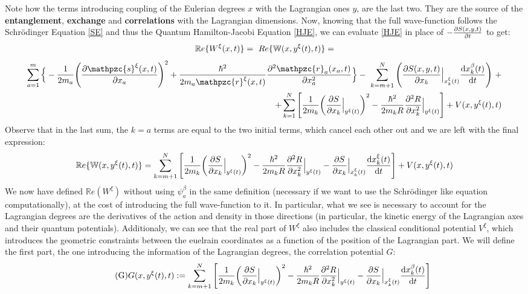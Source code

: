 \documentclass[11pt, a4paper]{article} %
\newcommand{\R}{\mathbb{R}} %
\newcommand{\z}{\mathpzc{s}}
\newcommand{\p}{\mathpzc{r}}
\newcommand{\W}{\mathbb{W}}
\begin{document}
Note how the terms introducing coupling of the Eulerian degrees $x$ with the Lagrangian ones $y$, are the last two. They are the source of the {\bf entanglement}, {\bf exchange} and {\bf correlations} with the Lagrangian dimensions. Now, knowing that the full wave-function follows the Schrödinger Equation \eqref{SE} and thus the Quantum Hamilton-Jacobi Equation \eqref{HJE}, we can evaluate \eqref{HJE} in place of $-\pdv{S(x,y,t)}{t}$ to get:\vspace{-0.2cm}
$$
\R e\{W^\xi(x,t)\}=\ Re\{\W(x, y^\xi(t),t)\}=\vspace{-0.14cm}
$$
\begin{equation*}
\begin{split}
\sum_{a=1}^m\Big\{-\frac{1}{2m_a} \qty(\pdv{\z^\xi(x,t)}{x_a})^2 +\frac{\hbar^2}{2m_a\p^\xi(x,t)}\pdv[2]{\p_a(x_a, t)}{x_a}\Big\}- \ \sum_{k=m+1}^N \qty( \pdv{S(x,y,t)}{x_k}\Big\rvert_{x_k^\xi(t)} \dv{x_k^\beta(t)}{t})\ + \\ \ +\sum_{k=1}^N \qty[\frac{1}{2m_k} \qty(\pdv{S}{x_k}\Big\rvert_{y^\xi(t)})^2 -\frac{\hbar^2}{2m_kR}\pdv[2]{R}{x_k}\Big\rvert_{y^\xi(t)} ] + V(x, y^\xi(t),t)
\end{split}
\end{equation*}
Observe that in the last sum, the $k=a$ terms are equal to the two initial terms, which cancel each other out and we are left with the final expression:\vspace{-0.3cm}\label{ReW}
\begin{equation*}
\R e\{\W(x, y^\xi(t),t)\}= \sum_{k=m+1}^N \qty[\frac{1}{2m_k} \qty(\pdv{S}{x_k}\Big\rvert_{y^\xi(t)})^2 -\frac{\hbar^2}{2m_kR}\pdv[2]{R}{x_k}\Big\rvert_{y^\xi(t)} -\pdv{S}{x_k}\Big\rvert_{x_k^\xi(t)} \dv{x_k^\xi(t)}{t} ] + V(x, y^\xi(t),t)
\end{equation*}
We now have defined $\R e(W^\xi)$ without using $\psi_a^\beta$ in the same definition (necessary if we want to use the Schrödinger like equation computationally), at the cost of introducing the full wave-function to it. In particular, what we see is necessary to account for the Lagrangian degrees are the derivatives of the action and density in those directions (in particular, the kinetic energy of the Lagrangian axes and their quantum potentials). Additionaly, we can see that the real part of $W^\xi$ also includes the classical conditional potential $V^\xi$, which introduces the geometric constraints between the euelrain coordinates as a function of the position of the Lagrangian part. We will define the first part, the one introducing the information of the Lagrangian degrees, the correlation potential $G$:
\begin{equation}\label{G}\tag{G}
G(x, y^\xi(t),t):=  \sum_{k=m+1}^N \qty[\frac{1}{2m_k} \qty(\pdv{S}{x_k}\Big\rvert_{y^\xi(t)})^2 -\frac{\hbar^2}{2m_kR}\pdv[2]{R}{x_k}\Big\rvert_{y^\xi(t)} -\pdv{S}{x_k}\Big\rvert_{x_k^\xi(t)} \dv{x_k^\beta(t)}{t} ]
\end{equation}
\end{document}
